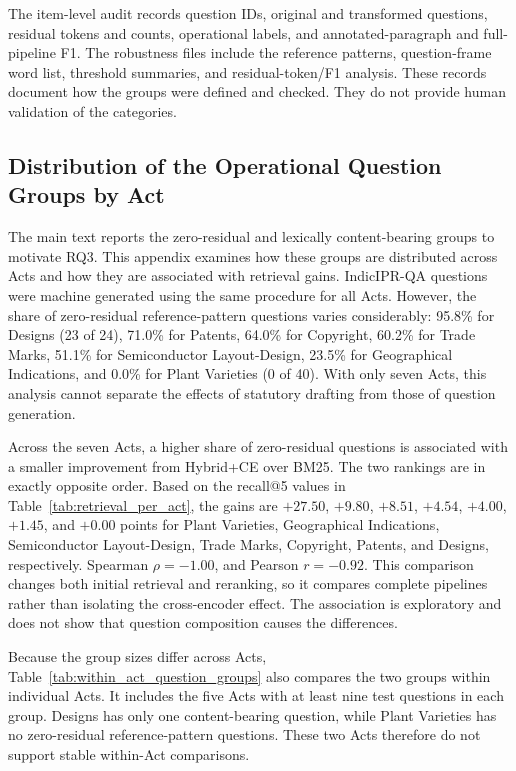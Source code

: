 \documentclass[pdflatex,sn-basic]{sn-jnl}%
\theoremstyle{thmstyleone}%
\theoremstyle{thmstyletwo}%
\theoremstyle{thmstylethree}%
\begin{document}
The item-level audit records question IDs, original and transformed questions,
residual tokens and counts, operational labels, and annotated-paragraph and
full-pipeline F1. The robustness files include the reference patterns,
question-frame word list, threshold summaries, and residual-token/F1 analysis.
These records document how the groups were defined and checked. They do not
provide human validation of the categories.

\subsection{Distribution of the Operational Question Groups by Act}

The main text reports the zero-residual and lexically content-bearing groups
to motivate RQ3. This appendix examines how these groups are distributed
across Acts and how they are associated with retrieval gains. IndicIPR-QA
questions were machine generated using the same procedure for all Acts.
However, the share of zero-residual reference-pattern questions varies
considerably: 95.8\% for Designs (23 of 24), 71.0\% for Patents, 64.0\% for
Copyright, 60.2\% for Trade Marks, 51.1\% for Semiconductor Layout-Design,
23.5\% for Geographical Indications, and 0.0\% for Plant Varieties (0 of 40).
With only seven Acts, this analysis cannot separate the effects of statutory
drafting from those of question generation.

Across the seven Acts, a higher share of zero-residual questions is associated
with a smaller improvement from Hybrid+CE over BM25. The two rankings are in
exactly opposite order. Based on the recall@5 values in
Table~\ref{tab:retrieval_per_act}, the gains are $+27.50$, $+9.80$, $+8.51$,
$+4.54$, $+4.00$, $+1.45$, and $+0.00$ points for Plant Varieties,
Geographical Indications, Semiconductor Layout-Design, Trade Marks, Copyright,
Patents, and Designs, respectively. Spearman $\rho=-1.00$, and Pearson
$r=-0.92$. This comparison changes both initial retrieval and reranking, so it
compares complete pipelines rather than isolating the cross-encoder effect.
The association is exploratory and does not show that question composition
causes the differences.

Because the group sizes differ across Acts,
Table~\ref{tab:within_act_question_groups} also compares the two groups within
individual Acts. It includes the five Acts with at least nine test questions
in each group. Designs has only one content-bearing question, while Plant
Varieties has no zero-residual reference-pattern questions. These two Acts
therefore do not support stable within-Act comparisons.
\end{document}
